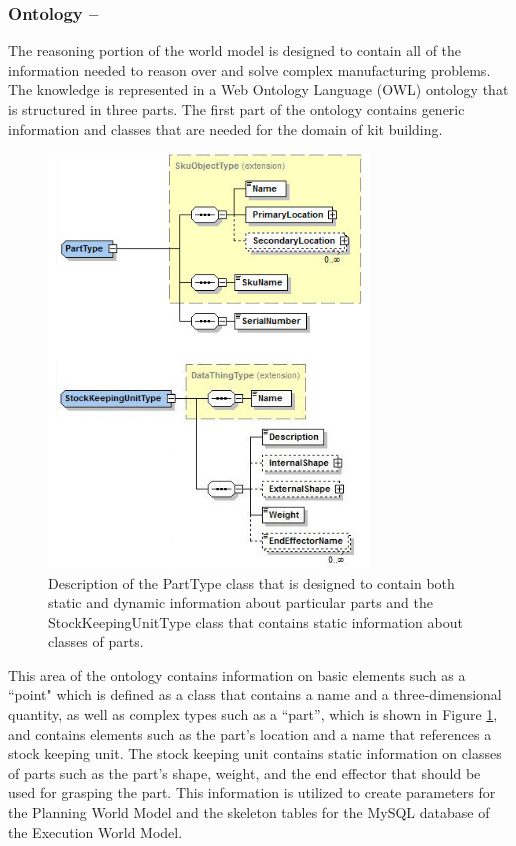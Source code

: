 \subsubsection{Ontology --}
\label{sect:Ontology}
The reasoning portion of the world model is designed to contain all of the information needed to reason over and solve complex manufacturing
problems. The knowledge is represented in a Web Ontology Language (OWL) ontology that is structured in three parts. The first part of the ontology contains generic information and classes that are needed for the domain of kit building. 
%
\begin{figure}[htb!]
\begin{center}
\includegraphics[width=8.5cm]{images/PartSKUV2.jpg}
\caption{Description of the PartType class that is designed to contain both static and dynamic information about particular parts and the StockKeepingUnitType class that contains static information about classes of parts.}
\label{fig:part}
\end{center}
\end{figure}
%
This area of the ontology contains information on basic elements such as a ``point" which is defined as a class that contains a name 
and a three-dimensional quantity, as well as complex types such as a ``part'', which is
shown in Figure \ref{fig:part}, and
contains elements such as the part's location and a name that references a stock keeping unit. The stock keeping unit contains static information on classes of parts such as the part's shape, weight, and the end effector that should be used for grasping the part. This information is utilized to create parameters for the Planning World
Model and the skeleton tables for the MySQL database of the Execution World Model.

